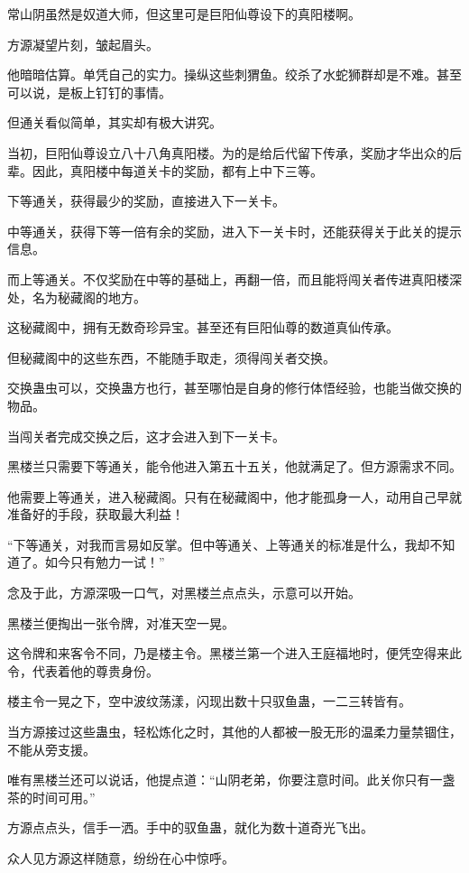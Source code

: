 \begin{this_body}
常山阴虽然是奴道大师，但这里可是巨阳仙尊设下的真阳楼啊。

方源凝望片刻，皱起眉头。

他暗暗估算。单凭自己的实力。操纵这些刺猬鱼。绞杀了水蛇狮群却是不难。甚至可以说，是板上钉钉的事情。

但通关看似简单，其实却有极大讲究。

当初，巨阳仙尊设立八十八角真阳楼。为的是给后代留下传承，奖励才华出众的后辈。因此，真阳楼中每道关卡的奖励，都有上中下三等。

下等通关，获得最少的奖励，直接进入下一关卡。

中等通关，获得下等一倍有余的奖励，进入下一关卡时，还能获得关于此关的提示信息。

而上等通关。不仅奖励在中等的基础上，再翻一倍，而且能将闯关者传进真阳楼深处，名为秘藏阁的地方。

这秘藏阁中，拥有无数奇珍异宝。甚至还有巨阳仙尊的数道真仙传承。

但秘藏阁中的这些东西，不能随手取走，须得闯关者交换。

交换蛊虫可以，交换蛊方也行，甚至哪怕是自身的修行体悟经验，也能当做交换的物品。

当闯关者完成交换之后，这才会进入到下一关卡。

黑楼兰只需要下等通关，能令他进入第五十五关，他就满足了。但方源需求不同。

他需要上等通关，进入秘藏阁。只有在秘藏阁中，他才能孤身一人，动用自己早就准备好的手段，获取最大利益！

“下等通关，对我而言易如反掌。但中等通关、上等通关的标准是什么，我却不知道了。如今只有勉力一试！”

念及于此，方源深吸一口气，对黑楼兰点点头，示意可以开始。

黑楼兰便掏出一张令牌，对准天空一晃。

这令牌和来客令不同，乃是楼主令。黑楼兰第一个进入王庭福地时，便凭空得来此令，代表着他的尊贵身份。

楼主令一晃之下，空中波纹荡漾，闪现出数十只驭鱼蛊，一二三转皆有。

当方源接过这些蛊虫，轻松炼化之时，其他的人都被一股无形的温柔力量禁锢住，不能从旁支援。

唯有黑楼兰还可以说话，他提点道：“山阴老弟，你要注意时间。此关你只有一盏茶的时间可用。”

方源点点头，信手一洒。手中的驭鱼蛊，就化为数十道奇光飞出。

众人见方源这样随意，纷纷在心中惊呼。


\end{this_body}

